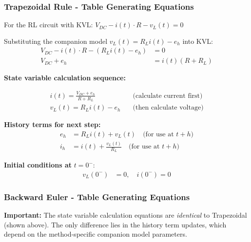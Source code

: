 \subsubsection*{Trapezoidal Rule - Table Generating Equations}

For the RL circuit with KVL: $V_{DC} - i(t) \cdot R - v_L(t) = 0$

Substituting the companion model $v_L(t) = R_L i(t) - e_h$ into KVL:
\begin{align}
    V_{DC} - i(t) \cdot R - (R_L i(t) - e_h) &= 0 \\
    V_{DC} + e_h &= i(t)(R + R_L)
\end{align}

\textbf{State variable calculation sequence:}
\begin{tcolorbox}[colback=burntOrange!10, colframe=burntOrange!70!black, title={\textbf{Trapezoidal: State Variables at Time $t$ for \Cref{fig:b01_circuit}}}]
\begin{align}
    \boxed{i(t) = \frac{V_{DC} + e_h}{R + R_L}} \quad &\text{(calculate current first)} \\[0.5em]
    \boxed{v_L(t) = R_L i(t) - e_h} \quad &\text{(then calculate voltage)}
\end{align}

\textbf{History terms for next step:}
\begin{align}
    e_h &= R_L i(t) + v_L(t) \quad \text{(for use at } t+h\text{)} \\
    i_h &= i(t) + \frac{v_L(t)}{R_L} \quad \text{(for use at } t+h\text{)}
\end{align}

\textbf{Initial conditions at } $t = 0^-$:
\begin{align}
    v_L(0^-) &= 0, \quad i(0^-) = 0
\end{align}
\end{tcolorbox}

\subsubsection*{Backward Euler - Table Generating Equations}

\textbf{Important:} The state variable calculation equations are \textit{identical} to Trapezoidal (shown above). The only difference lies in the history term updates, which depend on the method-specific companion model parameters.

